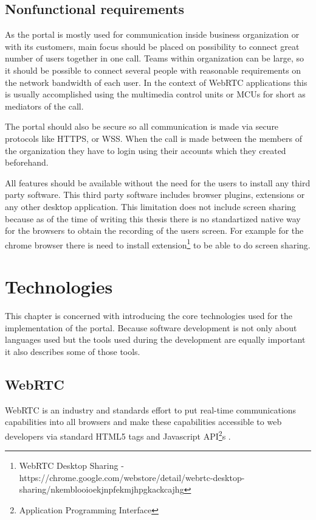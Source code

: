 \documentclass[
  digital, %
  table,   %
  lof,     %
  nolot,     %
]{fithesis3}
\begin{document}
\section{Nonfunctional requirements}
As the portal is mostly used for communication inside business organization or with its customers, main focus should be placed on possibility to connect great number of users together in one call. Teams within organization can be large, so it should be possible to connect several people with reasonable requirements on the network bandwidth of each user. In the context of WebRTC applications this is usually accomplished using the multimedia control units or MCUs for short as mediators of the call.

The portal should also be secure so all communication is made via secure protocols like HTTPS, or WSS. When the call is made between the members of the organization they have to login using their accounts which they created beforehand. 

All features should be available without the need for the users to install any third party software. This third party software includes browser plugins, extensions or any other desktop application. This limitation does not include screen sharing because as of the time of writing this thesis there is no standartized native way for the browsers to obtain the recording of the users screen. For example for the chrome browser there is need to install extension\footnote{WebRTC Desktop Sharing - https://chrome.google.com/webstore/detail/webrtc-desktop-sharing/nkemblooioekjnpfekmjhpgkackcajhg} to be able to do screen sharing.

\chapter{Technologies}
This chapter is concerned with introducing the core technologies used for the implementation of the portal. Because software development is not only about languages used but the tools used during the development are equally important it also describes some of those tools.

\section{WebRTC}
WebRTC is an industry and standards effort to put real-time communications capabilities into all browsers and make these capabilities accessible to web developers via standard HTML5 tags and Javascript API\footnote{Application Programming Interface}s \cite{webrtcBook}.
\end{document}
